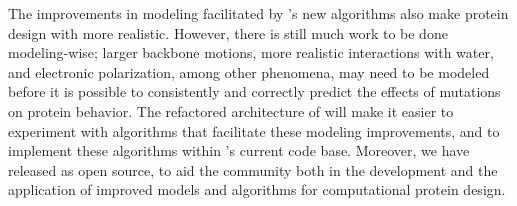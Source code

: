 The improvements in modeling facilitated by 's new algorithms also make protein design with \osprey more realistic.  However, there is still much work to be done modeling-wise; larger backbone motions, more realistic interactions with water, and electronic polarization, among other phenomena, may need to be modeled before it is possible to consistently and correctly predict the effects of mutations on protein behavior.  The refactored architecture of  will make it easier to experiment with algorithms that facilitate these modeling improvements, and to implement these algorithms within \osprey's current code base.  Moreover, we have released  as open source, to aid the community both in the development and the application of improved models and algorithms for computational protein design.  


